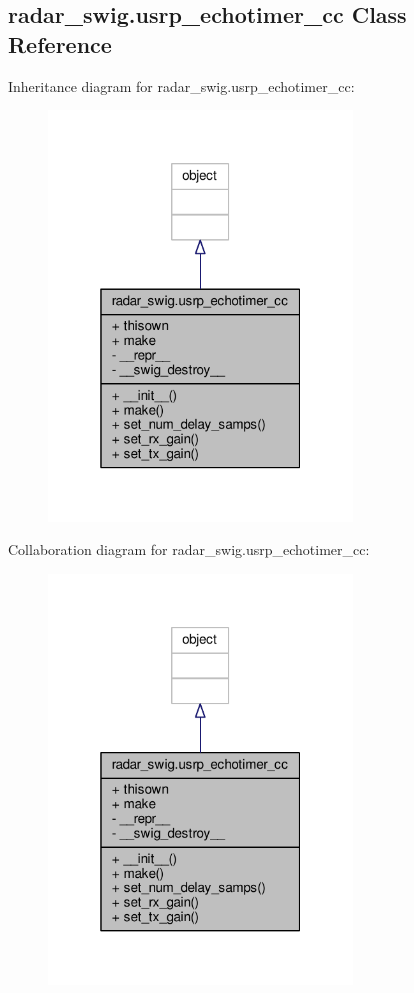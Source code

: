 \subsection{radar\+\_\+swig.\+usrp\+\_\+echotimer\+\_\+cc Class Reference}
\label{classradar__swig_1_1usrp__echotimer__cc}


Inheritance diagram for radar\+\_\+swig.\+usrp\+\_\+echotimer\+\_\+cc\+:
\nopagebreak
\begin{figure}[H]
\begin{center}
\leavevmode
\includegraphics[width=229pt]{d3/d4a/classradar__swig_1_1usrp__echotimer__cc__inherit__graph}
\end{center}
\end{figure}


Collaboration diagram for radar\+\_\+swig.\+usrp\+\_\+echotimer\+\_\+cc\+:
\nopagebreak
\begin{figure}[H]
\begin{center}
\leavevmode
\includegraphics[width=229pt]{db/dc4/classradar__swig_1_1usrp__echotimer__cc__coll__graph}
\end{center}
\end{figure}
